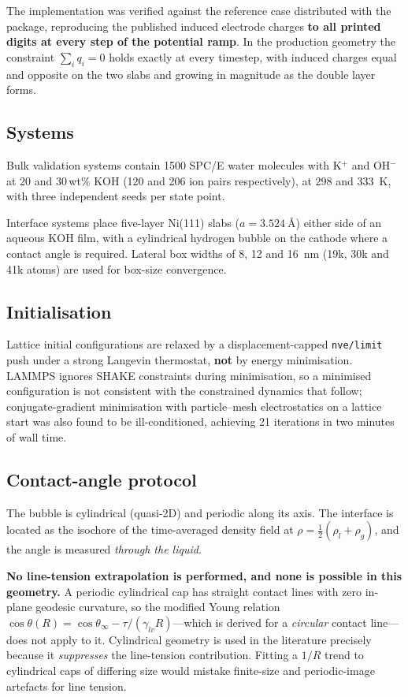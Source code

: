 \documentclass[11pt,a4paper]{article}
\begin{document}
The implementation was verified against the reference case distributed with the package, reproducing
the published induced electrode charges \textbf{to all printed digits at every step of the potential
ramp}. In the production geometry the constraint $\sum_i q_i = 0$ holds exactly at every timestep,
with induced charges equal and opposite on the two slabs and growing in magnitude as the double layer
forms.

\subsection{Systems}
Bulk validation systems contain 1500 SPC/E water molecules with K$^+$ and OH$^-$ at 20 and
30\,wt\% KOH (120 and 206 ion pairs respectively), at 298 and \SI{333}{\kelvin}, with three
independent seeds per state point.

Interface systems place five-layer Ni(111) slabs ($a = \SI{3.524}{\angstrom}$) either side of an
aqueous KOH film, with a cylindrical hydrogen bubble on the cathode where a contact angle is
required. Lateral box widths of 8, 12 and \SI{16}{\nano\metre} (19k, 30k and 41k atoms) are used for
box-size convergence.

\subsection{Initialisation}
Lattice initial configurations are relaxed by a displacement-capped \texttt{nve/limit} push under a
strong Langevin thermostat, \textbf{not} by energy minimisation. LAMMPS ignores SHAKE constraints
during minimisation, so a minimised configuration is not consistent with the constrained dynamics
that follow; conjugate-gradient minimisation with particle--mesh electrostatics on a lattice start
was also found to be ill-conditioned, achieving 21 iterations in two minutes of wall time.

\subsection{Contact-angle protocol}
The bubble is cylindrical (quasi-2D) and periodic along its axis. The interface is located as the
isochore of the time-averaged density field at $\rho = \tfrac12(\rho_l + \rho_g)$, and the angle is
measured \emph{through the liquid}.

\textbf{No line-tension extrapolation is performed, and none is possible in this geometry.} A
periodic cylindrical cap has straight contact lines with zero in-plane geodesic curvature, so the
modified Young relation $\cos\theta(R) = \cos\theta_\infty - \tau/(\gamma_{lv}R)$---which is derived
for a \emph{circular} contact line---does not apply to it. Cylindrical geometry is used in the
literature precisely because it \emph{suppresses} the line-tension contribution. Fitting a $1/R$
trend to cylindrical caps of differing size would mistake finite-size and periodic-image artefacts
for line tension.
\end{document}
